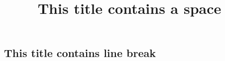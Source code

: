     \begin{article}
    \title {This title contains    a space}
    \section {This title contains
    line break}
    \end{article}
